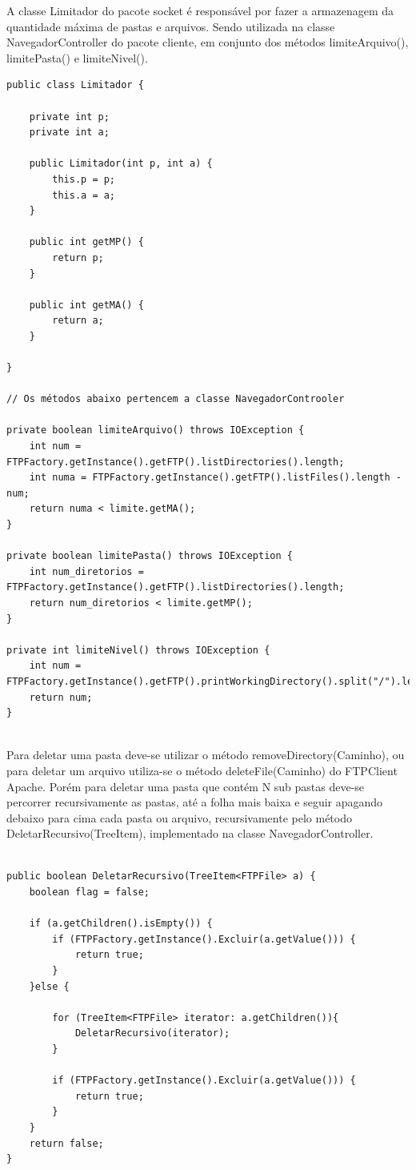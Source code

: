 \documentclass[12pt]{article}
\begin{document}
A classe Limitador do pacote socket é responsável por fazer a armazenagem da quantidade máxima de pastas e arquivos. Sendo utilizada na classe NavegadorController do pacote cliente, em conjunto dos métodos limiteArquivo(), limitePasta()  e limiteNivel().
 
 \begin{lstlisting}
public class Limitador {

	private int p;
	private int a;
	
	public Limitador(int p, int a) {
		this.p = p;
		this.a = a;
	}
	
	public int getMP() {
		return p;
	}
	
	public int getMA() {
		return a;
	}

}

// Os métodos abaixo pertencem a classe NavegadorControoler

private boolean limiteArquivo() throws IOException {
	int num = FTPFactory.getInstance().getFTP().listDirectories().length;
	int numa = FTPFactory.getInstance().getFTP().listFiles().length - num;
	return numa < limite.getMA();
}

private boolean limitePasta() throws IOException {
	int num_diretorios = FTPFactory.getInstance().getFTP().listDirectories().length;
	return num_diretorios < limite.getMP();
}

private int limiteNivel() throws IOException {
	int num = FTPFactory.getInstance().getFTP().printWorkingDirectory().split("/").length;
	return num;
}


\end{lstlisting}
	Para deletar uma pasta deve-se utilizar o método removeDirectory(Caminho), ou para deletar um arquivo utiliza-se o método deleteFile(Caminho) do FTPClient Apache. Porém para deletar uma pasta que contém N sub pastas deve-se percorrer recursivamente as pastas, até a folha mais baixa e seguir apagando debaixo para cima cada pasta ou arquivo, recursivamente pelo método DeletarRecursivo(TreeItem), implementado na classe NavegadorController.  
\begin{lstlisting}

public boolean DeletarRecursivo(TreeItem<FTPFile> a) {
	boolean flag = false;
	
	if (a.getChildren().isEmpty()) {
		if (FTPFactory.getInstance().Excluir(a.getValue())) {
			return true;
		}
	}else {
	
		for (TreeItem<FTPFile> iterator: a.getChildren()){
			DeletarRecursivo(iterator);
		}
		
		if (FTPFactory.getInstance().Excluir(a.getValue())) {
			return true;
		}
	}
	return false;
}
\end{lstlisting}
\end{document}
